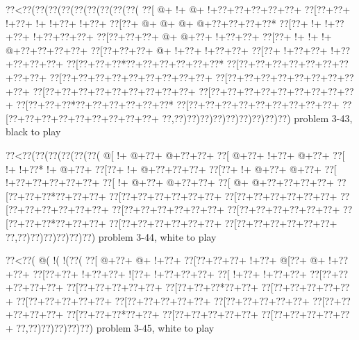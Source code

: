 \vbox{\vbox{\goo
\0??<\0??(\0??(\0??(\0??(\0??(\0??(\0??(\0??(\0??(
\0??[\- @+\- !+\- @+\- !+\0??+\0??+\0??+\0??+\0??+
\0??[\0??+\0??+\- !+\0??+\- !+\- !+\0??+\- !+\0??+
\0??[\0??+\- @+\- @+\- @+\- @+\0??+\0??+\0??+\0??*
\0??[\0??+\- !+\- !+\0??+\0??+\- !+\0??+\0??+\0??+
\0??[\0??+\0??+\0??+\- @+\- @+\0??+\- !+\0??+\0??+
\0??[\0??+\- !+\- !+\- !+\- @+\0??+\0??+\0??+\0??+
\0??[\0??+\0??+\0??+\- @+\- !+\0??+\- !+\0??+\0??+
\0??[\0??+\- !+\0??+\0??+\- !+\0??+\0??+\0??+\0??+
\0??[\0??+\0??+\0??*\0??+\0??+\0??+\0??+\0??+\0??*
\0??[\0??+\0??+\0??+\0??+\0??+\0??+\0??+\0??+\0??+
\0??[\0??+\0??+\0??+\0??+\0??+\0??+\0??+\0??+\0??+
\0??[\0??+\0??+\0??+\0??+\0??+\0??+\0??+\0??+\0??+
\0??[\0??+\0??+\0??+\0??+\0??+\0??+\0??+\0??+\0??+
\0??[\0??+\0??+\0??+\0??+\0??+\0??+\0??+\0??+\0??+
\0??[\0??+\0??+\0??*\0??+\0??+\0??+\0??+\0??+\0??*
\0??[\0??+\0??+\0??+\0??+\0??+\0??+\0??+\0??+\0??+
\0??[\0??+\0??+\0??+\0??+\0??+\0??+\0??+\0??+\0??+
\0??,\0??)\0??)\0??)\0??)\0??)\0??)\0??)\0??)\0??)
}
\hfil problem 3-43, black to play\hfil\break
}

\vbox{\vbox{\goo
\0??<\0??(\0??(\0??(\0??(\0??(\0??(
\- @[\- !+\- @+\0??+\- @+\0??+\0??+
\0??[\- @+\0??+\- !+\0??+\- @+\0??+
\0??[\- !+\- !+\0??*\- !+\- @+\0??+
\0??[\0??+\- !+\- @+\0??+\0??+\0??+
\0??[\0??+\- !+\- @+\0??+\- @+\0??+
\0??[\- !+\0??+\0??+\0??+\0??+\0??+
\0??[\- !+\- @+\0??+\- @+\0??+\0??+
\0??[\- @+\- @+\0??+\0??+\0??+\0??+
\0??[\0??+\0??+\0??*\0??+\0??+\0??+
\0??[\0??+\0??+\0??+\0??+\0??+\0??+
\0??[\0??+\0??+\0??+\0??+\0??+\0??+
\0??[\0??+\0??+\0??+\0??+\0??+\0??+
\0??[\0??+\0??+\0??+\0??+\0??+\0??+
\0??[\0??+\0??+\0??+\0??+\0??+\0??+
\0??[\0??+\0??+\0??*\0??+\0??+\0??+
\0??[\0??+\0??+\0??+\0??+\0??+\0??+
\0??[\0??+\0??+\0??+\0??+\0??+\0??+
\0??,\0??)\0??)\0??)\0??)\0??)\0??)
}
\hfil problem 3-44, white to play\hfil\break
}

\vbox{\vbox{\goo
\0??<\0??(\- @(\- !(\- !(\0??(
\0??[\- @+\0??+\- @+\- !+\0??+
\0??[\0??+\0??+\0??+\- !+\0??+
\- @[\0??+\- @+\- !+\0??+\0??+
\0??[\0??+\0??+\- !+\0??+\0??+
\- ![\0??+\- !+\0??+\0??+\0??+
\0??[\- !+\0??+\- !+\0??+\0??+
\0??[\0??+\0??+\0??+\0??+\0??+
\0??[\0??+\0??+\0??+\0??+\0??+
\0??[\0??+\0??+\0??*\0??+\0??+
\0??[\0??+\0??+\0??+\0??+\0??+
\0??[\0??+\0??+\0??+\0??+\0??+
\0??[\0??+\0??+\0??+\0??+\0??+
\0??[\0??+\0??+\0??+\0??+\0??+
\0??[\0??+\0??+\0??+\0??+\0??+
\0??[\0??+\0??+\0??*\0??+\0??+
\0??[\0??+\0??+\0??+\0??+\0??+
\0??[\0??+\0??+\0??+\0??+\0??+
\0??,\0??)\0??)\0??)\0??)\0??)
}
\hfil problem 3-45, white to play\hfil\break
}

